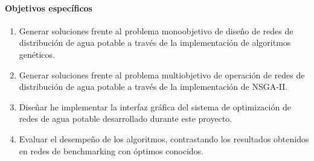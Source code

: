 \documentclass[11pt,letterpaper]{article}
\begin{document}
\paragraph{Objetivos específicos}%
\begin{enumerate}
\item Generar soluciones frente al problema monoobjetivo de diseño de redes de distribución de agua potable a través de la implementación de algoritmos genéticos.
\item Generar soluciones frente al problema multiobjetivo de operación de redes de distribución de agua potable a través de la implementación de NSGA-II.
\item Diseñar he implementar la interfaz gráfica del sistema de optimización de redes de agua potable desarrollado durante este proyecto.
\item Evaluar el desempeño de los algoritmos, contrastando los resultados obtenidos en redes de benchmarking con óptimos conocidos.

\end{enumerate}
\end{document}
